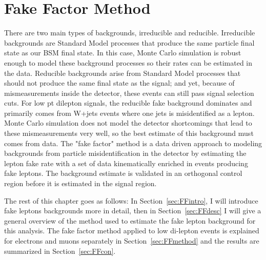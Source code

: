 \chapter{Fake Factor Method}
\label{ch:fakefactor}
There are two main types of backgrounds, irreducible and reducible. Irreducible backgrounds are Standard Model processes that produce the same particle final state as our BSM final state.  In this case, Monte Carlo simulation is robust enough to model these background processes so their rates can be estimated in the data.  Reducible backgrounds arise from Standard Model processes that should not produce the same final state as the signal; and yet, because of mismeasurements inside the detector, these events can still pass signal selection cuts.  For low pt dilepton signals, the reducible fake background dominates and primarily comes from W+jets events where one jets is misidentified as a lepton.  Monte Carlo simulation does not model the detector shortcomings that lead to these mismeasurements very well, so the best estimate of this background must comes from data.  The "fake factor" method is a data driven approach to modeling backgrounds from particle misidentification in the detector by estimating the lepton fake rate with a set of data kinematically enriched in events producing fake leptons.  The background estimate is validated in an orthogonal control region before it is estimated in the signal region. 

The rest of this chapter goes as follows:  In Section~\ref{sec:FFintro}, I will introduce fake leptons backgrounds more in detail, then in Section~\ref{sec:FFdesc} I will give a general overview of the method used to estimate the fake lepton background for this analysis.   The fake factor method applied to low \pt{} di-lepton events is explained for electrons and muons separately in Section~\ref{sec:FFmethod} and the results are summarized in Section~\ref{sec:FFcon}.

